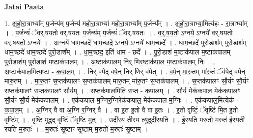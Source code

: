 \documentclass[17pt]{extarticle}
\begin{document}
\textbf{Jatai Paata} \newline

1. अ॒हो॒रा॒त्राभ्या᳚म् प॒र्जन्य॑म् प॒र्जन्य॑ महोरा॒त्राभ्या॑ महोरा॒त्राभ्या᳚म् प॒र्जन्य᳚म् । . अ॒हो॒रा॒त्राभ्या॒मित्य॑हः - रा॒त्राभ्या᳚म् । . प॒र्जन्यं॑ ॅवर्.षयतो वर्.षयतः प॒र्जन्य॑म् प॒र्जन्यं॑ ॅवर्.षयतः । . व॒र्॒.ष॒य॒तो॒ ऽग्नये॒ ऽग्नये॑ वर्.षयतो वर्.षयतो॒ ऽग्नये᳚ । . अ॒ग्नये॑ धाम॒च्छदे॑ धाम॒च्छदे॒ ऽग्नये॒ ऽग्नये॑ धाम॒च्छदे᳚ । . धा॒म॒च्छदे॑ पुरो॒डाश॑म् पुरो॒डाश॑म् धाम॒च्छदे॑ धाम॒च्छदे॑ पुरो॒डाश᳚म् । . धा॒म॒च्छद॒ इति॑ धाम - छदे᳚ । . पु॒रो॒डाश॑ म॒ष्टाक॑पाल म॒ष्टाक॑पालम् पुरो॒डाश॑म् पुरो॒डाश॑ म॒ष्टाक॑पालम् । . अ॒ष्टाक॑पाल॒म् निर् णिर॒ष्टाक॑पाल म॒ष्टाक॑पाल॒म् निः । . अ॒ष्टाक॑पाल॒मित्य॒ष्टा - क॒पा॒ल॒म् । . निर् व॑पेद् वपे॒न् निर् णिर् व॑पेत् । . व॒पे॒न् मा॒रु॒तम् मा॑रु॒तं ॅव॑पेद् वपेन् मारु॒तम् । . मा॒रु॒तꣳ स॒प्तक॑पालꣳ स॒प्तक॑पालम् मारु॒तम् मा॑रु॒तꣳ स॒प्तक॑पालम् । . स॒प्तक॑पालꣳ सौ॒र्यꣳ सौ॒र्यꣳ स॒प्तक॑पालꣳ स॒प्तक॑पालꣳ सौ॒र्यम् । . स॒प्तक॑पाल॒मिति॑ स॒प्त - क॒पा॒ल॒म् । . सौ॒र्य मेक॑कपाल॒ मेक॑कपालꣳ सौ॒र्यꣳ सौ॒र्य मेक॑कपालम् । . एक॑कपाल म॒ग्निर॒ग्निरेक॑कपाल॒ मेक॑कपाल म॒ग्निः । . एक॑कपाल॒मित्येक॑ - क॒पा॒ल॒म् । . अ॒ग्निर् वै वा अ॒ग्नि र॒ग्निर् वै । . वा इ॒त इ॒तो वै वा इ॒तः । . इ॒तो वृष्टिं॒ ॅवृष्टि॑ मि॒त इ॒तो वृष्टि᳚म् । . वृष्टि॒ मुदुद् वृष्टिं॒ ॅवृष्टि॒ मुत् । . उदी॑रय तीरय॒ त्युदुदी॑रयति । . ई॒र॒य॒ति॒ म॒रुतो॑ म॒रुत॑ ईरयती रयति म॒रुतः॑ । . म॒रुतः॑ सृ॒ष्टाꣳ सृ॒ष्टाम् म॒रुतो॑ म॒रुतः॑ सृ॒ष्टाम् । \newline
\end{document}
